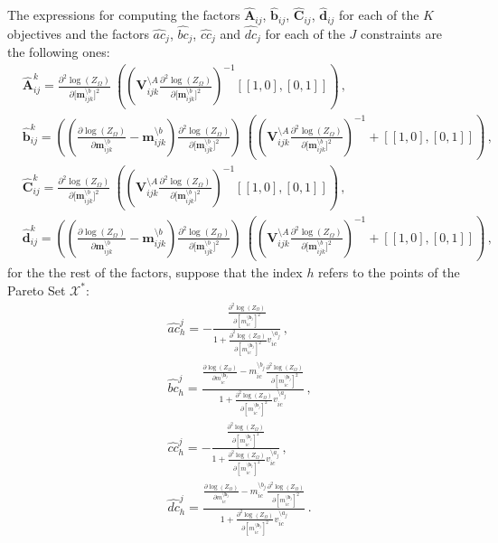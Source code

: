 The expressions for computing the factors $\hat{\boldsymbol{A}}_{ij}$, $\hat{\boldsymbol{b}}_{ij}$, $\hat{\boldsymbol{C}}_{ij}$, $\hat{\boldsymbol{d}}_{ij}$ for each of the $K$ objectives and the factors $\hat{ac}_j$, $\hat{bc}_j$, $\hat{cc}_j$ and $\hat{dc}_j$ for each of the $J$ constraints are the following ones:
\begin{align}
    & \hat{\boldsymbol{A}}_{ij}^{k} = \frac{\partial^2 \log(Z_\Omega)}{\partial\big[\boldsymbol{m}_{ijk}^{\setminus b}\big]^2}\ ((\boldsymbol{V}_{ijk}^{\setminus A}\frac{\partial^2 \log(Z_\Omega)}{\partial\big[\boldsymbol{m}_{ijk}^{\setminus b}\big]^2})^{-1}[[1, 0],[0, 1]])\,,\\
    & \hat{\boldsymbol{b}}_{ij}^{k} = ((\frac{\partial \log(Z_\Omega)}{\partial\boldsymbol{m}_{ijk}^{\setminus b}} - \boldsymbol{m}_{ijk}^{\setminus b})\frac{\partial^2 \log(Z_\Omega)}{\partial\big[\boldsymbol{m}_{ijk}^{\setminus b}\big]^2})\ ((\boldsymbol{V}_{ijk}^{\setminus A}\frac{\partial^2 \log(Z_\Omega)}{\partial\big[\boldsymbol{m}_{ijk}^{\setminus b}\big]^2})^{-1}+[[1, 0],[0, 1]])\,,\\
    & \hat{\boldsymbol{C}}_{ij}^{k} = \frac{\partial^2 \log(Z_\Omega)}{\partial\big[\boldsymbol{m}_{ijk}^{\setminus b}\big]^2}\ ((\boldsymbol{V}_{ijk}^{\setminus A}\frac{\partial^2 \log(Z_\Omega)}{\partial\big[\boldsymbol{m}_{ijk}^{\setminus b}\big]^2})^{-1}[[1, 0],[0, 1]])\,,\\
    & \hat{\boldsymbol{d}}_{ij}^{k} = ((\frac{\partial \log(Z_\Omega)}{\partial\boldsymbol{m}_{ijk}^{\setminus b}} - \boldsymbol{m}_{ijk}^{\setminus b})\frac{\partial^2 \log(Z_\Omega)}{\partial\big[\boldsymbol{m}_{ijk}^{\setminus b}\big]^2})\ ((\boldsymbol{V}_{ijk}^{\setminus A}\frac{\partial^2 \log(Z_\Omega)}{\partial\big[\boldsymbol{m}_{ijk}^{\setminus b}\big]^2})^{-1}+[[1, 0],[0, 1]])\,,
\end{align}
for the the rest of the factors, suppose that the index $h$ refers to the points of the Pareto Set $\mathcal{X}^*$:
\begin{align}
    & \hat{ac}_{h}^{j} = - \frac{\frac{\partial^2 \log(Z_\Omega)}{\partial [m_{ic}^{\setminus \boldsymbol{b}_j}]^2}}{1+\frac{\partial^2 \log(Z_\Omega)}{\partial [m_{ic}^{\setminus \boldsymbol{b}_j}]^2}v_{ic}^{\setminus a_j}}\,, \\
    & \hat{bc}_{h}^{j} = \frac{\frac{\partial \log(Z_\Omega)}{\partial m_{ic}^{\setminus \boldsymbol{b}_j}}-m_{ic}^{\setminus b_j}\frac{\partial^2 \log(Z_\Omega)}{\partial [m_{ic}^{\setminus \boldsymbol{b}_j}]^2}}{1+\frac{\partial^2 \log(Z_\Omega)}{\partial [m_{ic}^{\setminus \boldsymbol{b}_j}]^2}v_{ic}^{\setminus a_j}}\,, \\
    & \hat{cc}_{h}^{j} = - \frac{\frac{\partial^2 \log(Z_\Omega)}{\partial [m_{ic}^{\setminus \boldsymbol{b}_j}]^2}}{1+\frac{\partial^2 \log(Z_\Omega)}{\partial [m_{ic}^{\setminus \boldsymbol{b}_j}]^2}v_{ic}^{\setminus a_j}}\,, \\
    & \hat{dc}_{h}^{j} = \frac{\frac{\partial \log(Z_\Omega)}{\partial m_{ic}^{\setminus \boldsymbol{b}_j}}-m_{ic}^{\setminus b_j}\frac{\partial^2 \log(Z_\Omega)}{\partial [m_{ic}^{\setminus \boldsymbol{b}_j}]^2}}{1+\frac{\partial^2 \log(Z_\Omega)}{\partial [m_{ic}^{\setminus \boldsymbol{b}_j}]^2}v_{ic}^{\setminus a_j}}\,. 
\end{align}
